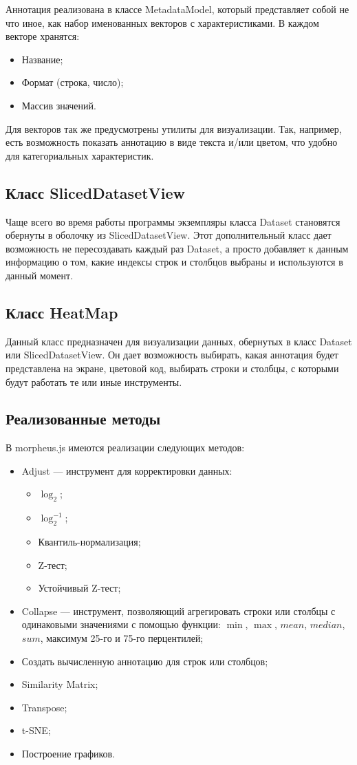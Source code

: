 \documentclass[annotation,specification]{itmo-student-thesis}
\begin{document}
Аннотация реализована в классе MetadataModel, который представляет собой не что иное, как набор именованных векторов с характеристиками. В каждом векторе хранятся:

\begin{itemize}
\item Название;
\item Формат (строка, число);
\item Массив значений.
\end{itemize}

Для векторов так же предусмотрены утилиты для визуализации. Так, например, есть возможность показать аннотацию в виде текста и/или цветом, что удобно для категориальных характеристик. 

\subsection{Класс SlicedDatasetView}
Чаще всего во время работы программы экземпляры класса Dataset становятся обернуты в оболочку из SlicedDatasetView. Этот дополнительный класс дает возможность не пересоздавать каждый раз Dataset, а просто добавляет к данным информацию о том, какие индексы строк и столбцов выбраны и используются в данный момент.

\subsection{Класс HeatMap}
Данный класс предназначен для визуализации данных, обернутых в класс Dataset или SlicedDatasetView. Он дает возможность выбирать, какая аннотация будет представлена на экране, цветовой код, выбирать строки и столбцы, с которыми будут работать те или иные инструменты.

\subsection{Реализованные методы}
В morpheus.js имеются реализации следующих методов:

\begin{itemize}
\item Adjust --- инструмент для корректировки данных:\begin{itemize}
    \item $\log_{2}$;
    \item $\log_{2}^{-1}$;
    \item Квантиль-нормализация;
    \item Z-тест;
    \item Устойчивый Z-тест;\end{itemize}
\item Collapse --- инструмент, позволяющий агрегировать строки или столбцы с одинаковыми значениями с помощью функции: $\min$, $\max$, $mean$, $median$, $sum$, максимум 25-го и 75-го перцентилей;
\item Создать вычисленную аннотацию для строк или столбцов;
\item Similarity Matrix;
\item Transpose;
\item t-SNE;
\item Построение графиков.
\end{itemize}
\end{document}
